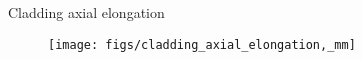 \begin{frame}{Cladding axial elongation}

    \scriptsize

    \begin{figure}[h]
        \texttt{[image: figs/cladding\_axial\_elongation,\_mm]}
    \end{figure}

\end{frame}